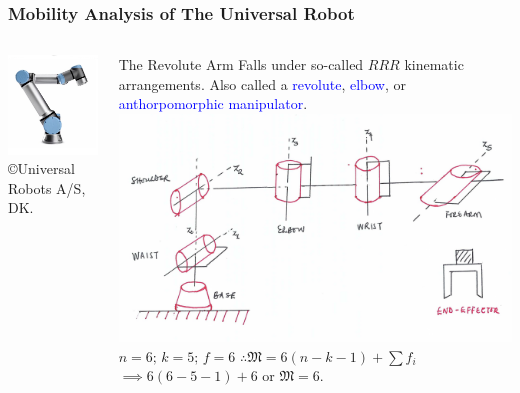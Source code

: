 \begin{frame}
	\frametitle{Mobility Analysis of The Universal Robot}
	\begin{columns}[]
		\begin{column}{.5\linewidth}
			\centering
			\includegraphics[width=\textwidth]{figures/ur16.jpg}
			\footnotesize{\copyright Universal Robots A/S, DK.}
		\end{column}
		\begin{column}{.5\linewidth}
			\centering
			\begin{block}{The Revolute Arm}
				\footnotesize{Falls under so-called $RRR$ kinematic arrangements. Also called a \textcolor{blue}{revolute}, \textcolor{blue}{elbow}, or \textcolor{blue}{anthorpomorphic manipulator}.}
			\includegraphics[width=\textwidth]{figures/ur_scheme.jpg}
			$n=6; \, k=5; \, f=6$ $\therefore \mathfrak{M}=6(n-k-1)+\sum f_i $ $\implies 6(6-5-1) + 6$ or $\mathfrak{M}=6$.
			\end{block}
		\end{column}
	\end{columns}
\end{frame}

